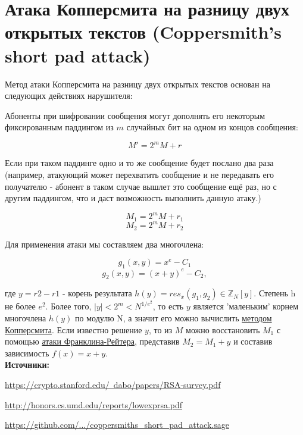 \documentclass[12pt,a4paper]{scrartcl}
\begin{document}
\section{Атака Копперсмита на разницу двух открытых текстов (Coppersmith’s short pad attack)}

Метод атаки Копперсмита на разницу двух открытых текстов основан на следующих действиях нарушителя: 

Абоненты при шифровании сообщения могут дополнять его некоторым фиксированным паддингом из $m$ случайных бит на одном из концов сообщения:

$$M' = 2^mM+r$$

Если при таком паддинге одно и то же сообщение будет послано два раза (например, атакующий может перехватить сообщение и не передавать его получателю - абонент в таком случае вышлет это сообщение ещё раз, но с другим паддингом, что и даст возможность выполнить данную атаку.)

$$M_1 = 2^mM+r_1$$
$$M_2 = 2^mM+r_2$$

Для применения атаки мы составляем два многочлена:

$$g_1(x,y)=x^e-C_1$$
$$g_2(x,y)=(x+y)^e-C_2,$$

где $y=r2-r1$ - корень результата $h(y)=res_x(g_1,g_2) \in \mathbb{Z}_N[y]$. Степень h не более $e^2$. Более того, $|y|< 2^m<N^{1/e^2}$, то есть $y$ является 'маленьким' корнем многочлена $h(y)$ по модулю N, а значит его можно вычислить \href{https://yatb.kksctf.ru/}{методом Копперсмита}. Если известно решение $y$, то из $M$ можно восстановить $M_1$ с помощью \href{https://yatb.kksctf.ru/}{атаки Франклина-Рейтера}, представив $M_2=M_1+y$ и составив зависимость $f(x)=x+y$.\\

\textbf{Источники:}

\href{https://crypto.stanford.edu/~dabo/papers/RSA-survey.pdf}{https://crypto.stanford.edu/~dabo/papers/RSA-survey.pdf}

\href{http://honors.cs.umd.edu/reports/lowexprsa.pdf}{http://honors.cs.umd.edu/reports/lowexprsa.pdf} 

\href{https://github.com/yud121212/Coppersmith-s-Short-Pad-Attack-Franklin-Reiter-Related-Message-Attack/blob/master/coppersmiths_short_pad_attack.sage}{https://github.com/.../coppersmiths\_short\_pad\_attack.sage}
\end{document}
